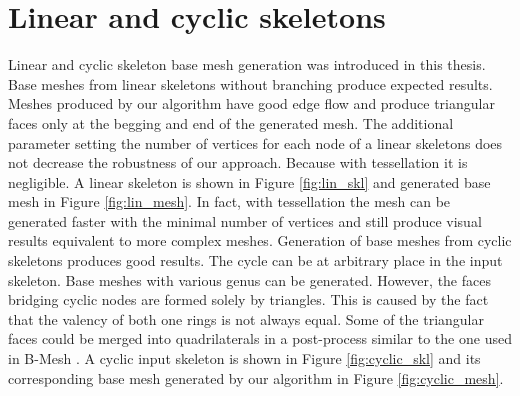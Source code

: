 \section{Linear and cyclic skeletons}

Linear and cyclic skeleton base mesh generation was introduced in this thesis.
Base meshes from linear skeletons without branching produce expected results.
Meshes produced by our algorithm have good edge flow and produce triangular faces only at the begging and end of the generated mesh.
The additional parameter setting the number of vertices for each node of a linear skeletons does not decrease the robustness of our approach.
Because with tessellation it is negligible.
A linear skeleton is shown in Figure \ref{fig:lin_skl} and generated base mesh in Figure \ref{fig:lin_mesh}.
In fact, with tessellation the mesh can be generated faster with the minimal number of vertices and still produce visual results equivalent to more complex meshes.
Generation of base meshes from cyclic skeletons produces good results.
The cycle can be at arbitrary place in the input skeleton.
Base meshes with various genus can be generated.
However, the faces bridging cyclic nodes are formed solely by triangles.
This is caused by the fact that the valency of both one rings is not always equal.
Some of the triangular faces could be merged into quadrilaterals in a post-process similar to the one used in B-Mesh \cite{ji_bm}.
A cyclic input skeleton is shown in Figure \ref{fig:cyclic_skl} and its corresponding base mesh generated by our algorithm in Figure \ref{fig:cyclic_mesh}.

